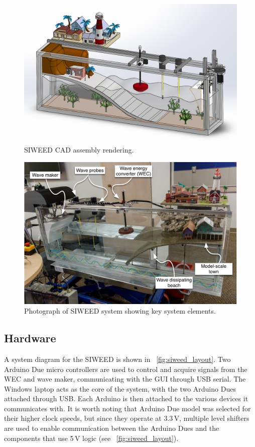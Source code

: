 \documentclass[hardware,article,submit,pdftex,moreauthors]{Definitions/mdpi}
\begin{document}
\begin{figure}[tb]
  \centering
  \includegraphics[width=1\textwidth]{diagrams/SIWEED_CAD.png}
  \caption{SIWEED CAD assembly rendering.}
  \label{fig:CAD}
\end{figure}

\begin{figure}[tb]
  \centering
  \includegraphics[width=1\textwidth]{diagrams/siweed_photo_with_callouts.pdf}
  \caption{Photograph of SIWEED system showing key system elements.}
  \label{fig:siweed_photo_with_callouts}
\end{figure}

\subsection{Hardware}
A system diagram for the SIWEED is shown in \figurename~\ref{fig:siweed_layout}.
Two Arduino Due micro controllers are used to control and acquire signals from the WEC and wave maker, communicating with the GUI through USB serial.
The Windows laptop acts as the core of the system, with the two Arduino Dues attached through USB. 
Each Arduino is then attached to the various devices it communicates with.
It is worth noting that Arduino Due model was selected for their higher clock speeds, but since they operate at 3.3\,V, multiple level shifters are used to enable communication between the Arduino Dues and the components that use 5\,V logic (see \figurename~\ref{fig:siweed_layout}).
\end{document}
